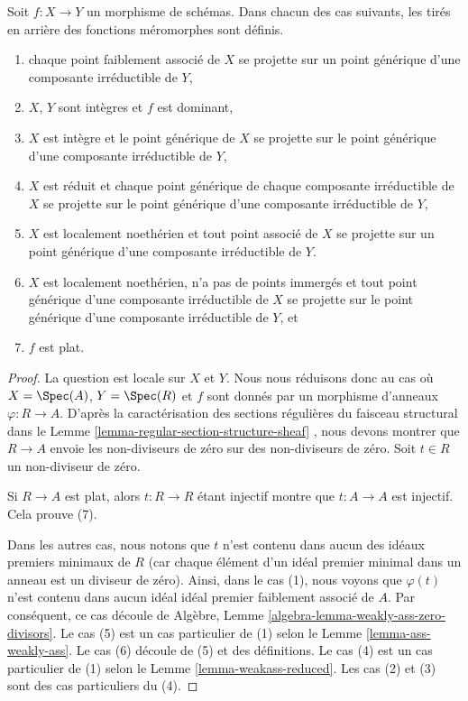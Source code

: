 \begin{lemma}
\label{lemma-pullback-meromorphic-sections-defined}
Soit  $f : X \to Y$  un morphisme de schémas. Dans chacun des cas suivants, les tirés
en arrière des fonctions méromorphes sont définis.
\begin{enumerate}
\item chaque point faiblement associé de  $X$  se projette sur un point générique
d'une composante irréductible de  $Y$,
\item $X$,  $Y$  sont intègres et  $f$  est dominant,
\item $X$  est intègre et le point générique de  $X$  se projette sur le
point générique d'une composante irréductible de  $Y$,
\item $X$  est réduit et chaque point générique de chaque composante
irréductible de  $X$  se projette sur le point générique d'une composante
irréductible de  $Y$,
\item $X$  est localement noethérien et tout point associé de  $X$  se
projette sur un point générique d'une composante irréductible de  $Y$.
\item $X$  est localement noethérien, n'a pas de points immergés et tout point
générique d'une composante irréductible de  $X$  se projette sur le point
générique d'une composante irréductible de  $Y$, et
\item $f$  est plat.
\end{enumerate}
\end{lemma}

\begin{proof}
La question est locale sur  $X$  et  $Y$. Nous nous réduisons donc
au cas où  $X = \Spec(A)$,  $Y = \Spec(R)$  et  $f$  sont donnés par un morphisme
d'anneaux  $\varphi : R \to A$. D'après la caractérisation des sections régulières du
faisceau structural dans le Lemme  \ref{lemma-regular-section-structure-sheaf} , nous devons montrer que
 $R \to A$  envoie les non-diviseurs de zéro sur des non-diviseurs de zéro. Soit
 $t \in R$  un non-diviseur de zéro.

\medskip\noindent
Si  $R \to A$  est plat, alors  $t : R \to R$  étant injectif montre que
 $t : A \to A$  est injectif. Cela prouve (7).

\medskip\noindent
Dans les autres cas, nous notons que  $t$  n'est contenu dans aucun des
idéaux premiers minimaux de  $R$  (car chaque élément d'un idéal premier
minimal dans un anneau est un diviseur de zéro). Ainsi, dans le cas (1), nous
voyons que  $\varphi(t)$  n'est contenu dans aucun idéal idéal premier faiblement
associé de  $A$. Par conséquent, ce cas découle de Algèbre, Lemme
 \ref{algebra-lemma-weakly-ass-zero-divisors}. Le cas (5) est un cas particulier de (1) selon le Lemme
 \ref{lemma-ass-weakly-ass}. Le cas (6) découle de (5) et des définitions. Le cas (4) est un cas
particulier de (1) selon le Lemme  \ref{lemma-weakass-reduced}. Les cas (2) et (3) sont des cas
particuliers du (4).
\end{proof}


